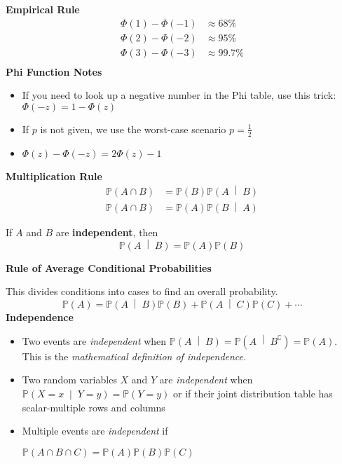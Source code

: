 \documentclass[titlepage, 12pt, leqno]{article}
\begin{document}
\begin{multicols}{2}
\columnbreak

\textbf{Empirical Rule}
\begin{align*}
    \Phi(1) - \Phi(-1) &\approx 68\% \\
    \Phi(2) - \Phi(-2) &\approx 95\% \\
    \Phi(3) - \Phi(-3) &\approx 99.7\% \\
\end{align*}
\textbf{Phi Function Notes}
\begin{itemize}
    \item If you need to look up a negative number in the Phi table, use this
        trick: $\Phi(-z) = 1 - \Phi(z)$
    \item If $p$ is not given, we use the worst-case scenario $p=\frac{1}{2}$
    \item $\Phi(z) - \Phi(-z) = 2\Phi(z)-1$
\end{itemize}

\textbf{Multiplication Rule}
\begin{align*}
    \mathbb{P}(A \cap B) &= \mathbb{P}(B) \mathbb{P}\left(A \;\middle|\; B\right) 
    \\
    \mathbb{P}(A \cap B) &= \mathbb{P}(A) \mathbb{P}\left(B \;\middle|\; A\right) 
\end{align*}
\begin{note}
    If $A$ and $B$ are \textbf{independent}, then 
    \[
    \mathbb{P}\left(A \;\middle|\; B\right) = \mathbb{P}(A)\mathbb{P}(B)
    \]
\end{note}

\textbf{Rule of Average Conditional Probabilities}

This divides conditions into cases to find an overall probability.
\[
\mathbb{P}(A) = \mathbb{P}\left(A \;\middle|\; B\right) \mathbb{P}(B) +
\mathbb{P}\left(A \;\middle|\; C\right) \mathbb{P}(C) + \cdots 
\]
\textbf{Independence}
\begin{itemize}
    \item Two events are \textit{independent} when $ \mathbb{P}\left(A 
        \;\middle|\; B\right) = \mathbb{P}\left(A \;\middle|\; 
        B^\complement \right) = \mathbb{P}(A)$. This is the \textit{mathematical
        definition of independence.}
    \item Two random variables $X$ and $Y$ are \textit{independent} when
        $ \mathbb{P}\left(X=x \;\middle|\; Y=y\right) = \mathbb{P}(Y=y)$ or if 
        their joint distribution table has scalar-multiple rows and columns
    \item Multiple events are \textit{independent} if 

        $\mathbb{P}(A \cap B \cap C) = \mathbb{P}(A)\mathbb{P}(B)\mathbb{P}(C)$
\end{itemize}
\end{multicols}
\end{document}
